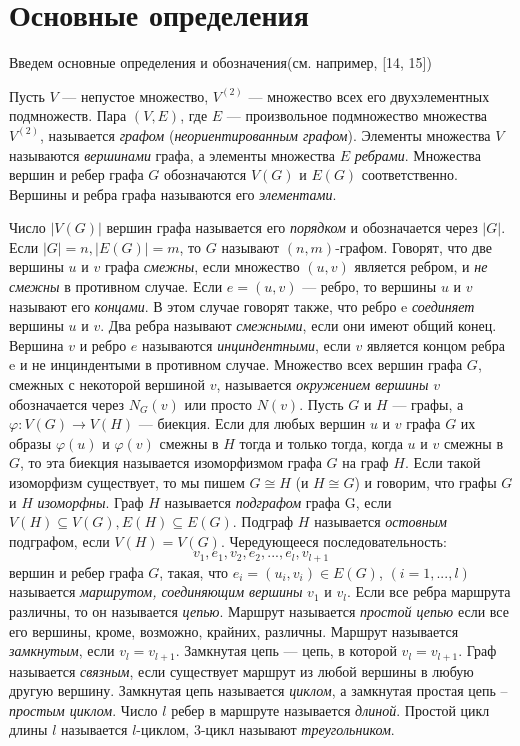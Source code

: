 \documentclass[a4paper,12pt]{article}
\begin{document}
		\section{Основные определения}
		\renewcommand{\baselinestretch}{1.5}
		\begin{large}
		Введем основные определения и обозначения(см. например,  [14, 15])

		Пусть $V$ --- непустое множество, $V^{(2)}$ --- множество всех его двухэлементных подмножеств.
		Пара $(V,E)$, где $E$ --- произвольное подмножество множества $V^{(2)}$, называется {\it графом} ({\it неориентированным графом}). 
		Элементы множества $V$ называются {\it вершинами} графа, а элементы множества $E$ {\it ребрами}.
		Множества вершин и ребер графа $G$ обозначаются $V(G)$ и $E(G)$ соответственно.
		Вершины и ребра графа называются его {\it элементами}.

		Число $|V(G)|$ вершин графа называется его {\it порядком} и обозначается через $|G|$.
		Если $|G| = n, |E(G)|=m$, то $G$ называют $(n,m)$-графом.
		Говорят, что две вершины $u$ и $v$ графа {\it смежны}, если множество $(u, v)$ является ребром, и {\it не смежны} в противном случае.
		Если $e=(u, v)$ --- ребро, то вершины $u$ и $v$ называют его {\it концами}.
		В этом случае говорят также, что ребро e {\it соединяет} вершины $u$ и $v$.
		Два ребра называют {\it смежными}, если они имеют общий конец.
		Вершина $v$ и ребро $e$ называются {\it инциндентными}, если $v$ является концом ребра e и {не инциндентыми} в противном случае.
		Множество всех вершин графа $G$, смежных с некоторой вершиной $v$, называется {\it окружением вершины} $v$ обозначается через $N_{G}(v)$ или просто $N(v)$.
		Пусть $G$ и $H$ --- графы, а $\varphi:V(G)\rightarrow V(H)$ --- биекция.
		Если для любых вершин $u$ и $v$ графа $G$ их образы $\varphi(u)$ и $\varphi(v)$ смежны в $H$ тогда и только тогда, когда $u$ и $v$ смежны в $G$, то эта биекция называется изоморфизмом графа $G$ на граф $H$.
		Если такой изоморфизм существует, то мы пишем $G \cong H$ (и $H \cong G$) и говорим, что графы $G$ и $H$ {\it изоморфны}.
		Граф $H$ называется {\it подграфом} графа G, если $V(H) \subseteq V(G), E(H) \subseteq E(G)$.
		Подграф $H$ называется {\it остовным} подграфом, если $V(H)=V(G)$.
		Чередующееся последовательность:
		$$
			v_1, e_1, v_2, e_2, ..., e_l, v_{l+1}
		$$
		вершин и ребер графа $G$, такая, что $e_{i}=(u_{i}, v_{i}) \in E(G)$, $(i=1, ..., l)$ называется {\it маршрутом, соединяющим вершины} $v_1$ и $v_l$.
		Если все ребра маршрута различны, то он называется {\it цепью}.
		Маршрут называется {\it простой цепью} если все его вершины, кроме, возможно, крайних, различны.
		Маршрут называется {\it замкнутым}, если $v_{l}=v_{l+1}$.
		Замкнутая цепь --- цепь, в которой  $v_{l}=v_{l+1}$.
		Граф называется {\it связным}, если существует маршрут из любой вершины в любую другую вершину.
		Замкнутая цепь называется {\it циклом}, а замкнутая простая цепь -- {\it простым циклом}.
		Число $l$ ребер в маршруте называется {\it длиной}.
		Простой цикл длины $l$  называется $l$-циклом, 3-цикл называют {\it треугольником}.


\end{large}
\end{document}
